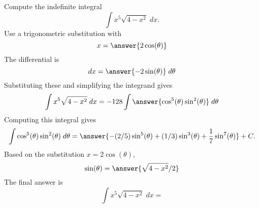 \documentclass{ximera}
\begin{document}
\begin{problem}

Compute the indefinite integral
\[
\int   x^5 \sqrt{4-x^2} \; dx.
\]
Use a trigonometric substitution with\\
\[
x = \answer{2\cos(\theta)}
\]
The differential is\\
\[
dx = \answer{-2\sin(\theta)} \; d\theta
\]
Substituting these and simplifying the integrand gives\\
\[
\int   x^5\sqrt{4 - x^2}\; dx = -128\int \answer{\cos^5(\theta)\sin^2(\theta)} \; d\theta
\]
Computing this integral gives
\[
\int \cos^5(\theta)\sin^2(\theta) \; d\theta = \answer{-(2/5)\sin^5(\theta) + (1/3)\sin^3(\theta) +\frac17 \sin^7(\theta)} + C.
\]
Based on the substitution $x = 2\cos(\theta)$, \\
\[
\sin(\theta) = \answer{\sqrt{4 - x^2}/2}
\]
The final answer is
\[
\int   x^5\sqrt{4 -  x^2}\; dx = 
\]
\begin{center}
\begin{multipleChoice}
\end{multipleChoice}
\end{center}

\end{problem}
\end{document}
